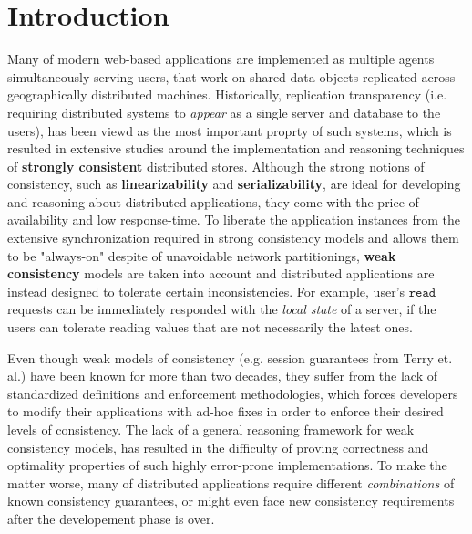 \section{Introduction}
Many of modern web-based applications are implemented as multiple
agents simultaneously serving users, that work on shared data
objects replicated across geographically distributed machines. 
Historically, replication transparency (i.e. requiring distributed
systems to \emph{appear} as a single server and database to the users), has been viewd as the most
important proprty of such systems, which is resulted in extensive
studies around the implementation and reasoning techniques of {\bf
strongly consistent} distributed stores. Although the strong notions of
consistency, such as {\bf linearizability} and {\bf serializability}, 
are ideal for developing and reasoning about distributed applications, they
come with the price of availability and low response-time. 
To liberate the application instances from the extensive
synchronization required in strong consistency models and allows 
them to be "always-on" despite of unavoidable
network partitionings, {\bf weak consistency} models are taken into
account and distributed applications are instead designed to
tolerate certain inconsistencies. For example, user's $\mathtt{read}$ requests can
be immediately responded with the \emph{local state} of a server, if the users
can tolerate reading values that are not necessarily the latest ones.

Even though weak models of consistency (e.g. session guarantees from
Terry et. al.) have been known for more than two decades, they suffer 
from the lack of standardized definitions and enforcement
methodologies, which forces developers to modify their applications
with ad-hoc fixes in order to enforce their desired levels of
consistency. The lack of a
general reasoning framework for weak consistency models, has resulted in the
difficulty of proving correctness and optimality properties of such
highly error-prone implementations. To make the matter worse, many of
distributed applications require different \emph{combinations} of known
consistency guarantees, or might even face new consistency requirements
after the developement phase is over.

